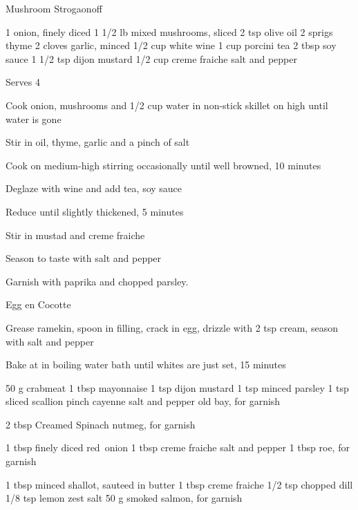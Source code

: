 \begin{denserecipe}{Mushroom Strogaonoff}{}
\begin{ingredients}
1 onion, finely diced
1 1/2 lb mixed mushrooms, sliced
2 tsp olive oil
2 sprigs thyme
2 cloves garlic, minced
1/2 cup white wine
1 cup porcini tea
2 tbsp soy sauce
1 1/2 tsp dijon mustard
1/2 cup creme fraiche
salt and pepper
\end{ingredients}
\nextcolumn
Serves 4
\begin{steps}
    \item Cook onion, mushrooms and 1/2 cup water in non-stick skillet on high until water is gone
    \item Stir in oil, thyme, garlic and a pinch of salt
    \item Cook on medium-high stirring occasionally until well browned, 10 minutes
    \item Deglaze with wine and add tea, soy sauce
    \item Reduce until slightly thickened, 5 minutes
    \item Stir in mustad and creme fraiche
    \item Season to taste with salt and pepper
\end{steps}
Garnish with paprika and chopped parsley.
\end{denserecipe}

\begin{densecard}{Egg en Cocotte}{}
\begin{densesteps}
    \item Grease ramekin, spoon in filling, crack in egg, drizzle with 2 tsp cream, season with salt and pepper
    \item Bake at  in boiling water bath until whites are just set, 15 minutes
\end{densesteps}
\begin{paracol}{3}

\begin{ingredients}
50 g crabmeat
1 tbsp mayonnaise
1 tsp dijon mustard
1 tsp minced parsley
1 tsp sliced scallion
pinch cayenne
salt and pepper
old bay, for garnish
\end{ingredients}
\nextcolumn
{}

\begin{ingredients}
2 tbsp Creamed Spinach
nutmeg, for garnish
\end{ingredients}


\begin{ingredients}
1 tbsp finely diced red~onion
1 tbsp creme fraiche
salt and pepper
1 tbsp roe, for garnish
\end{ingredients}
\nextcolumn
{}

\begin{ingredients}
1 tbsp minced shallot, sauteed in butter
1 tbsp creme fraiche
1/2 tsp chopped dill
1/8 tsp lemon zest
salt
50 g smoked salmon, for garnish
\end{ingredients}
\end{paracol}
\end{densecard}

